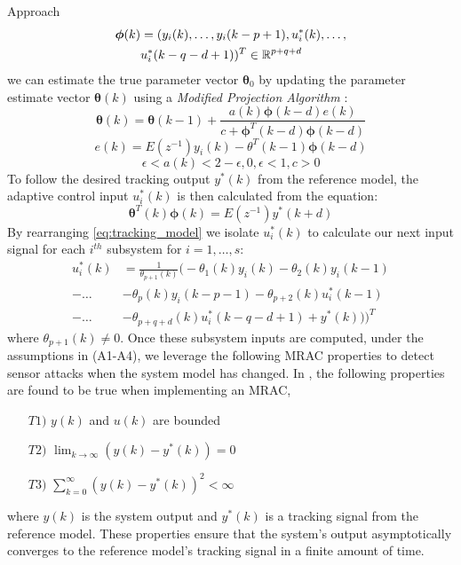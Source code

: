 \begin{section}{Approach}
	\begin{equation}
	\begin{split}
	\bm{\phi}(k)&=(y_i(k), \dots ,y_i(k-p+1),u^*_i(k), \dots , \\
	& u^*_i(k-q-d+1))^T \in \mathbb{R}^{p+q+d}
	\end{split}
	\end{equation}
we can estimate the true parameter vector $\bm{\theta}_0$ by updating the parameter estimate vector $\bm{\theta}(k)$ using a \textit{Modified Projection Algorithm} \cite{tao2003adaptive}:
	\begin{equation}
	\label{eq:Modified_Proj_Algorithm}
	\bm{\theta}(k)=\bm{\theta}(k-1)+\frac{a(k)\bm{\phi}(k-d)e(k)}{c+\bm{\phi}^T(k-d)\bm{\phi}(k-d)}
	\end{equation}
	\begin{equation}
	e(k)=E(z^{-1})y_i(k)-\theta^T(k-1)\bm{\phi}(k-d)
	\end{equation}
	\begin{equation}
	\epsilon<a(k)<2-\epsilon, 0,\epsilon<1, c>0 \nonumber
	\end{equation}
To follow the desired tracking output $y^*(k)$ from the reference model, the adaptive control input $u^*_i(k)$ is then calculated from the equation:
    \begin{equation}
    \label{eq:tracking_model}
	\bm{\theta}^T(k)\bm{\phi}(k)=E(z^{-1})y^*(k+d)
	\end{equation}
By rearranging \eqref{eq:tracking_model} we isolate $u^*_i(k)$ to calculate our next input signal for each $i^{th}$ subsystem for $i=1,\dots,s$:
	\begin{equation}
	\begin{split}
	\label{eq:End}
	u^*_i(k)&=\frac{1}{\theta_{p+1}(k)}\big(-\theta_1(k)y_i(k)-\theta_2(k)y_i(k-1)  \\
    -\dots &-\theta_p(k)y_i(k-p-1)-\theta_{p+2}(k)u^*_i(k-1)  \\
	- \dots &- \theta_{p+q+d}(k)u^*_i(k-q-d+1) + y^*(k)) \big)^T
	\end{split}
	\end{equation}
where $\theta_{p+1}(k)\neq0 $. Once these subsystem inputs are computed, under the assumptions in (A1-A4), we leverage the following MRAC properties to detect sensor attacks when the system model has changed. In \cite{tao2003adaptive}, the following properties are found to be true when implementing an MRAC,
	\begin{enumerate}%
	\label{assumtions_ensure}
	\item[$T1)$] $y(k)$ and $u(k)$ are bounded 
	\item[$T2)$] $\lim_{k\to\infty}(y(k)-y^*(k))=0$
	\label{Truth2}
	\item[$T3)$] $\sum_{k=0}^\infty(y(k)-y^*(k))^2<\infty$
	\end{enumerate}
where $y(k)$ is the system output and $y^*(k)$ is a tracking signal from the reference model. These properties ensure that the system's output asymptotically converges to the reference model's tracking signal in a finite amount of time. 



\end{section}
